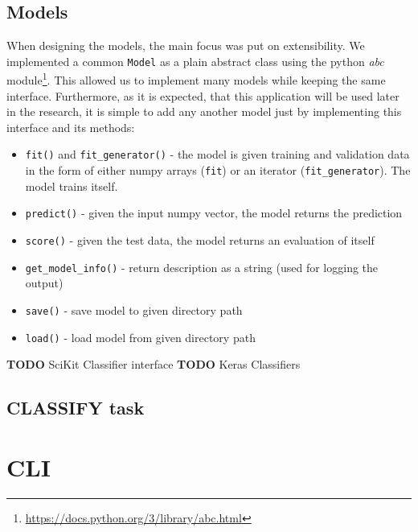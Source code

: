 \subsection*{Models}

When designing the models, the main focus was put on extensibility. We implemented a common \texttt{Model} as a plain abstract class using the python \textit{abc} module\footnote{\url{https://docs.python.org/3/library/abc.html}}. This allowed us to implement many models while keeping the same interface. Furthermore, as it is expected, that this application will be used later in the research, it is simple to add any another model just by implementing this interface and its methods:

\begin{itemize}

\item \texttt{fit()} and \texttt{fit\_generator()} - the model is given training and validation data in the form of either numpy arrays (\texttt{fit}) or an iterator (\texttt{fit\_generator}). The model trains itself.

\item \texttt{predict()} - given the input numpy vector, the model returns the prediction

\item \texttt{score()} - given the test data, the model returns an evaluation of itself

\item \texttt{get\_model\_info()} - return description as a string (used for logging the output)

\item \texttt{save()} - save model to given directory path

\item \texttt{load()} - load model from given directory path

\end{itemize} 

\textbf{TODO} SciKit Classifier interface
\textbf{TODO} Keras Classifiers


\subsection{CLASSIFY task}

\section{CLI}
\label{cli}

